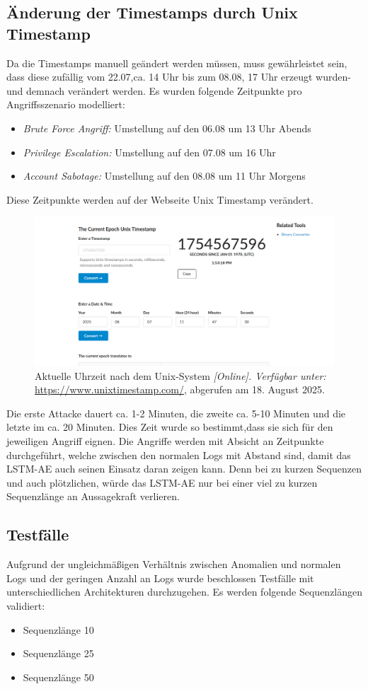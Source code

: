 \documentclass[a4paper,12pt]{article}
\let\footnote=\endnote
\begin{document}
	\subsection{Änderung der Timestamps durch Unix Timestamp}
	Da die Timestamps manuell geändert werden müssen, muss gewährleistet sein, dass diese zufällig vom 22.07,ca. 14 Uhr bis zum 08.08, 17 Uhr erzeugt wurden- und demnach verändert werden. Es wurden folgende Zeitpunkte pro Angriffsszenario modelliert:
	\begin{itemize}
		\item \textit{Brute Force Angriff:} Umstellung auf den 06.08 um 13 Uhr Abends
		\item \textit{Privilege Escalation:} Umstellung auf den 07.08 um 16 Uhr
		\item \textit{Account Sabotage:} Umstellung auf den 08.08 um 11 Uhr Morgens
	\end{itemize}
	Diese Zeitpunkte werden auf der Webseite Unix Timestamp \footnote{https://www.unixtimestamp.com/} verändert.
	
	\begin{figure}[H]
		\centering
		\includegraphics[width=0.9\linewidth]{Bilder/screenshot019}
		\caption{Aktuelle Uhrzeit nach dem Unix-System \textit{[Online]. Verfügbar unter:} \url{https://www.unixtimestamp.com/}, abgerufen am 18. August 2025.}
		\label{fig:screenshot019}
	\end{figure}
	Die erste Attacke dauert ca. 1-2 Minuten, die zweite ca. 5-10 Minuten und die letzte im ca. 20 Minuten. Dies Zeit wurde so bestimmt,dass sie sich für den jeweiligen Angriff eignen. Die Angriffe werden mit Absicht an Zeitpunkte durchgeführt, welche zwischen den normalen Logs mit Abstand sind, damit das LSTM-AE auch seinen Einsatz daran zeigen kann. Denn bei zu kurzen Sequenzen und auch plötzlichen, würde das LSTM-AE nur bei einer viel zu kurzen Sequenzlänge an Aussagekraft verlieren.
	
	\subsection{Testfälle}
	Aufgrund der ungleichmäßigen Verhältnis zwischen Anomalien und normalen Logs und der geringen Anzahl an Logs wurde beschlossen Testfälle mit unterschiedlichen Architekturen durchzugehen.
	Es werden folgende Sequenzlängen validiert:
	\begin{itemize}
		\item Sequenzlänge 10
		\item Sequenzlänge 25
		\item Sequenzlänge 50
	\end{itemize}
	
\end{document}
